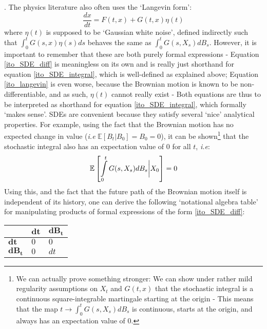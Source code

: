 . The physics literature also often uses the `Langevin form':
\begin{equation}
\label{ito_langevin}
\frac{dx}{dt} = F(t,x) + G(t,x)\eta(t)
\end{equation}
where $\eta(t)$ is supposed to be `Gaussian white noise', defined indirectly such that $\int_0^{t}G(s,x)\eta(s)ds$ behaves the same as $\int_0^{t}G(s,X_s)dB_s$. However, it is important to remember that these are both purely formal expressions - Equation \eqref{ito_SDE_diff} is meaningless on its own and is really just shorthand for equation \eqref{ito_SDE_integral}, which is well-defined as explained above; Equation \eqref{ito_langevin} is even worse, because the Brownian motion is known to be non-differentiable, and as such, $\eta(t)$ cannot really exist - Both equations are thus to be interpreted as shorthand for equation \eqref{ito_SDE_integral}, which formally `makes sense'. SDEs are convenient because they satisfy several `nice' analytical properties. For example, using the fact that the Brownian motion has no expected change in value (\emph{i.e} $\mathbb{E}[B_t | B_0] = B_0 = 0$), it can be shown\footnote{We can actually prove something stronger: We can show under rather mild regularity assumptions on $X_t$ and $G(t,x)$ that the stochastic integral is a continuous square-integrable martingale starting at the origin - This means that the map $t \to \int_0^{t}G(s,X_s)dB_s$ is continuous, starts at the origin, and always has an expectation value of $0$.} that the stochastic integral also has an expectation value of $0$ for all $t$, \emph{i.e}:
\begin{equation*}
\mathbb{E}\left[\int\limits_{0}^{t} G(s,X_s)dB_s \bigg{|} X_0\right] = 0
\end{equation*}
Using this, and the fact that the future path of the Brownian motion itself is independent of its history, one can derive the following `notational algebra table' for manipulating products of formal expressions of the form \eqref{ito_SDE_diff}:
\\
\begin{center}
	\begin{tabularx}{0.4\textwidth}{ 
			| >{\centering\arraybackslash}X 
			| >{\centering\arraybackslash}X 
			| >{\centering\arraybackslash}X | }
		\hline
		& $\mathbf{dt}$ & $\mathbf{dB_t}$ \\
		\hline
		$\mathbf{dt}$ & $0$  &  $0$ \\ 
		\hline
		$\mathbf{dB_t}$ & $0$  & $dt$ \\
		\hline
	\end{tabularx}
\end{center}
